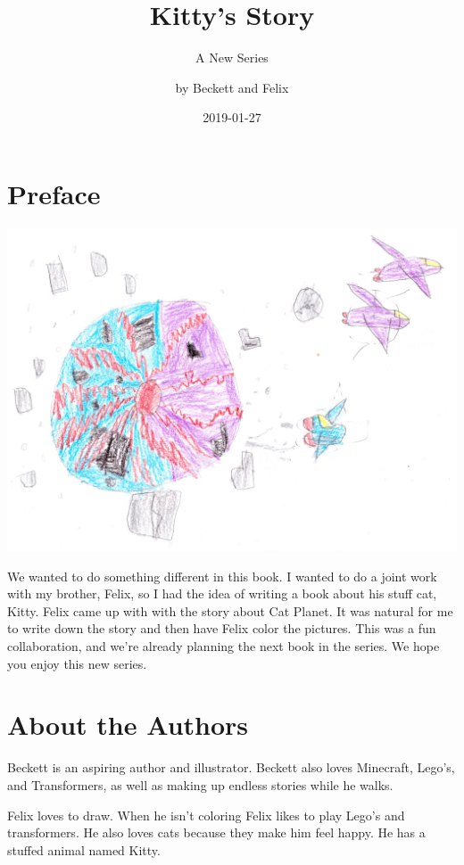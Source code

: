 \documentclass[12pt,oneside]{krantz}
\title{Kitty's Story}
\subtitle{A New Series}
\author{by Beckett and Felix}
\date{2019-01-27}
\begin{document}
\maketitle

{
\setcounter{tocdepth}{1}
\tableofcontents
}
\hypertarget{preface}{%
\chapter*{Preface}\label{preface}}


\includegraphics{img/catplanet.jpg}

We wanted to do something different in this book. I wanted to do a joint
work with my brother, Felix, so I had the idea of writing a book about
his stuff cat, Kitty. Felix came up with with the story about Cat
Planet. It was natural for me to write down the story and then have
Felix color the pictures. This was a fun collaboration, and we're
already planning the next book in the series. We hope you enjoy this new
series.

\hypertarget{about-the-authors}{%
\chapter*{About the Authors}\label{about-the-authors}}


Beckett is an aspiring author and illustrator. Beckett also loves
Minecraft, Lego's, and Transformers, as well as making up endless
stories while he walks.

Felix loves to draw. When he isn't coloring Felix likes to play Lego's
and transformers. He also loves cats because they make him feel happy.
He has a stuffed animal named Kitty.
\end{document}
